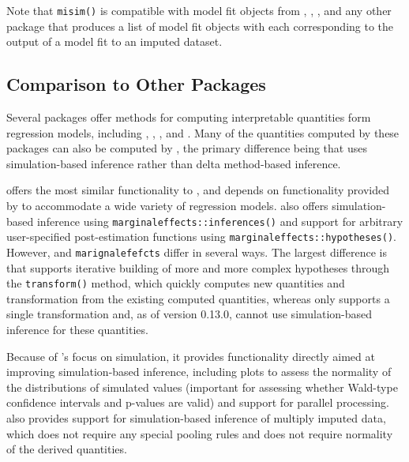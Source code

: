 Note that \texttt{misim()} is compatible with model fit objects from , , , and any other package that produces a list of model fit objects with each corresponding to the output of a model fit to an imputed dataset.

\hypertarget{comparison-to-other-packages}{%
\subsection{Comparison to Other Packages}\label{comparison-to-other-packages}}

Several packages offer methods for computing interpretable quantities form regression models, including , , , and . Many of the quantities computed by these packages can also be computed by , the primary difference being that  uses simulation-based inference rather than delta method-based inference.

 offers the most similar functionality to , and  depends on functionality provided by  to accommodate a wide variety of regression models.  also offers simulation-based inference using \texttt{marginaleffects::inferences()} and support for arbitrary user-specified post-estimation functions using \texttt{marginaleffects::hypotheses()}. However,  and \texttt{marignalefefcts} differ in several ways. The largest difference is that  supports iterative building of more and more complex hypotheses through the \texttt{transform()} method, which quickly computes new quantities and transformation from the existing computed quantities, whereas  only supports a single transformation and, as of version 0.13.0, cannot use simulation-based inference for these quantities.

Because of 's focus on simulation, it provides functionality directly aimed at improving simulation-based inference, including plots to assess the normality of the distributions of simulated values (important for assessing whether Wald-type confidence intervals and p-values are valid) and support for parallel processing.  also provides support for simulation-based inference of multiply imputed data, which does not require any special pooling rules and does not require normality of the derived quantities.

